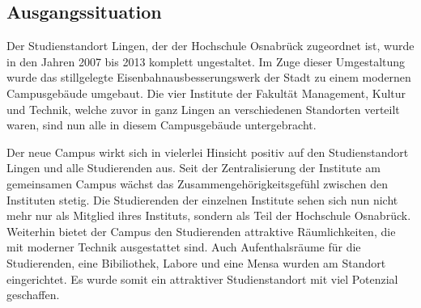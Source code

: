 \subsection{Ausgangssituation}
\label{sec:Ausgangssituation}

Der Studienstandort Lingen, der der Hochschule Osnabrück zugeordnet ist, wurde
in den Jahren 2007 bis 2013 komplett ungestaltet. Im Zuge dieser Umgestaltung
wurde das stillgelegte Eisenbahnausbesserungswerk der Stadt zu einem modernen
Campusgebäude umgebaut. Die vier Institute der Fakultät Management, Kultur und
Technik, welche zuvor in ganz Lingen an verschiedenen Standorten verteilt
waren, sind nun alle in diesem Campusgebäude untergebracht.

Der neue Campus wirkt sich in vielerlei Hinsicht positiv auf den
Studienstandort Lingen und alle Studierenden aus. Seit der Zentralisierung der
Institute am gemeinsamen Campus wächst das Zusammengehörigkeitsgefühl zwischen
den Instituten stetig. Die Studierenden der einzelnen Institute sehen sich nun
nicht mehr nur als Mitglied ihres Instituts, sondern als Teil der Hochschule
Osnabrück. Weiterhin bietet der Campus den Studierenden attraktive
Räumlichkeiten, die mit moderner Technik ausgestattet sind. Auch Aufenthalsräume
für die Studierenden, eine Bibiliothek, Labore und eine Mensa wurden am Standort
eingerichtet. Es wurde somit ein attraktiver Studienstandort mit viel Potenzial
geschaffen.